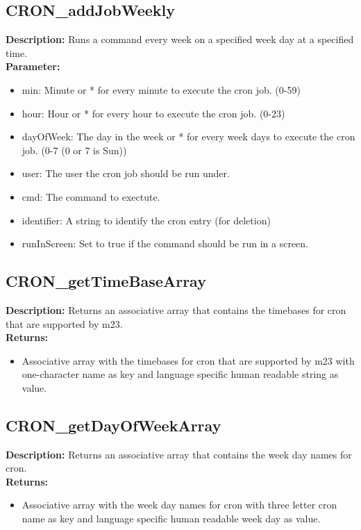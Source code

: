 \subsection{CRON\_addJobWeekly}
\textbf{Description:} Runs a command every week on a specified week day at a specified time.\\
\textbf{Parameter:}
\begin{itemize}
\item min: Minute or * for every minute to execute the cron job. (0-59)
\item hour: Hour or * for every hour to execute the cron job. (0-23)
\item dayOfWeek: The day in the week or * for every week days to execute the cron job. (0-7 (0 or 7 is Sun))
\item user: The user the cron job should be run under.
\item cmd: The command to exectute.
\item identifier: A string to identify the cron entry (for deletion)
\item runInScreen: Set to true if the command should be run in a screen.
\end{itemize}

\subsection{CRON\_getTimeBaseArray}
\textbf{Description:} Returns an associative array that contains the timebases for cron that are supported by m23.\\
\textbf{Returns:}
\begin{itemize}
\item Associative array with the timebases for cron that are supported by m23 with one-character name as key and language specific human readable string as value.
\end{itemize}

\subsection{CRON\_getDayOfWeekArray}
\textbf{Description:} Returns an associative array that contains the week day names for cron.\\
\textbf{Returns:}
\begin{itemize}
\item Associative array with the week day names for cron with three letter cron name as key and language specific human readable week day as value.
\end{itemize}

